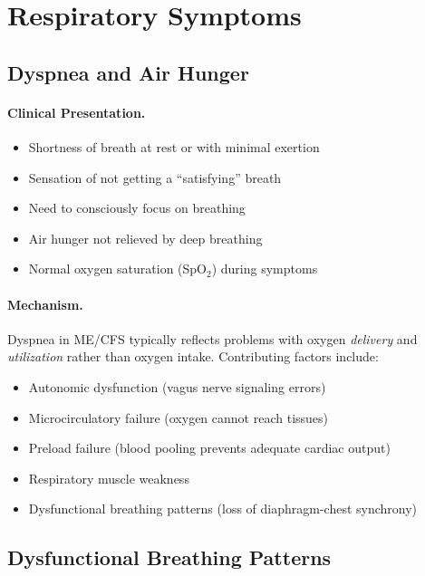 \section{Respiratory Symptoms}
\label{sec:respiratory}

\subsection{Dyspnea and Air Hunger}
\label{subsec:dyspnea}

\paragraph{Clinical Presentation.}
\begin{itemize}
    \item Shortness of breath at rest or with minimal exertion
    \item Sensation of not getting a ``satisfying'' breath
    \item Need to consciously focus on breathing
    \item Air hunger not relieved by deep breathing
    \item Normal oxygen saturation (SpO$_2$) during symptoms
\end{itemize}

\paragraph{Mechanism.}
Dyspnea in ME/CFS typically reflects problems with oxygen \emph{delivery} and \emph{utilization} rather than oxygen intake. Contributing factors include:
\begin{itemize}
    \item Autonomic dysfunction (vagus nerve signaling errors)
    \item Microcirculatory failure (oxygen cannot reach tissues)
    \item Preload failure (blood pooling prevents adequate cardiac output)
    \item Respiratory muscle weakness
    \item Dysfunctional breathing patterns (loss of diaphragm-chest synchrony)
\end{itemize}

\subsection{Dysfunctional Breathing Patterns}
\label{subsec:dysfunctional-breathing}

